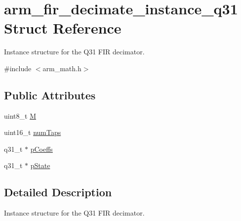 \hypertarget{structarm__fir__decimate__instance__q31}{\section{arm\-\_\-fir\-\_\-decimate\-\_\-instance\-\_\-q31 Struct Reference}
\label{structarm__fir__decimate__instance__q31}
}


Instance structure for the Q31 F\-I\-R decimator.  




{\ttfamily \#include $<$arm\-\_\-math.\-h$>$}

\subsection*{Public Attributes}
\begin{DoxyCompactItemize}
\item 
uint8\-\_\-t \hyperlink{structarm__fir__decimate__instance__q31_ad3d6936c36303b30dd38f1eddf248ae5}{M}
\item 
uint16\-\_\-t \hyperlink{structarm__fir__decimate__instance__q31_a37915d42b0dc5e3057ebe83110798482}{num\-Taps}
\item 
q31\-\_\-t $\ast$ \hyperlink{structarm__fir__decimate__instance__q31_a030d0391538c2481c5b348fd09a952ff}{p\-Coeffs}
\item 
q31\-\_\-t $\ast$ \hyperlink{structarm__fir__decimate__instance__q31_a0ef0ef9e265f7ab873cfc6daa7593fdb}{p\-State}
\end{DoxyCompactItemize}


\subsection{Detailed Description}
Instance structure for the Q31 F\-I\-R decimator. 

